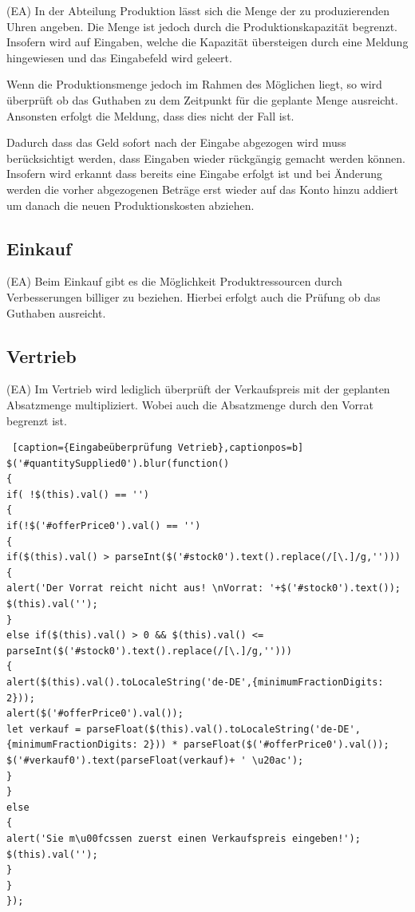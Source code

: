 (EA) In der Abteilung Produktion lässt sich die Menge der zu produzierenden Uhren angeben. Die Menge ist jedoch durch die Produktionskapazität begrenzt. Insofern wird auf Eingaben, welche die Kapazität übersteigen durch eine Meldung hingewiesen und das Eingabefeld wird geleert. 

Wenn die Produktionsmenge jedoch im Rahmen des Möglichen liegt, so wird überprüft ob das Guthaben zu dem Zeitpunkt für die geplante Menge ausreicht. Ansonsten erfolgt die Meldung, dass dies nicht der Fall ist. 

Dadurch dass das Geld sofort nach der Eingabe abgezogen wird muss berücksichtigt werden, dass Eingaben wieder rückgängig gemacht werden können. Insofern wird erkannt dass bereits eine Eingabe erfolgt ist und bei Änderung werden die vorher abgezogenen Beträge erst wieder auf das Konto hinzu addiert um danach die neuen Produktionskosten abziehen.

\subsection*{Einkauf}

(EA) Beim Einkauf gibt es die Möglichkeit Produktressourcen durch Verbesserungen billiger zu beziehen. Hierbei erfolgt auch die Prüfung ob das Guthaben ausreicht.

\subsection*{Vertrieb}

(EA) Im Vertrieb wird lediglich überprüft der Verkaufspreis mit der geplanten Absatzmenge multipliziert. Wobei auch die Absatzmenge durch den Vorrat begrenzt ist.

\lstset{language=Java}
\begin{lstlisting} [caption={Eingabeüberprüfung Vetrieb},captionpos=b]
$('#quantitySupplied0').blur(function()
{
if( !$(this).val() == '')
{
if(!$('#offerPrice0').val() == '')
{
if($(this).val() > parseInt($('#stock0').text().replace(/[\.]/g,'')))
{
alert('Der Vorrat reicht nicht aus! \nVorrat: '+$('#stock0').text());
$(this).val('');
}
else if($(this).val() > 0 && $(this).val() <= parseInt($('#stock0').text().replace(/[\.]/g,'')))
{
alert($(this).val().toLocaleString('de-DE',{minimumFractionDigits: 2}));
alert($('#offerPrice0').val());
let verkauf = parseFloat($(this).val().toLocaleString('de-DE',{minimumFractionDigits: 2})) * parseFloat($('#offerPrice0').val());
$('#verkauf0').text(parseFloat(verkauf)+ ' \u20ac');
}
}
else
{
alert('Sie m\u00fcssen zuerst einen Verkaufspreis eingeben!');
$(this).val('');
}
}
});
\end{lstlisting}

